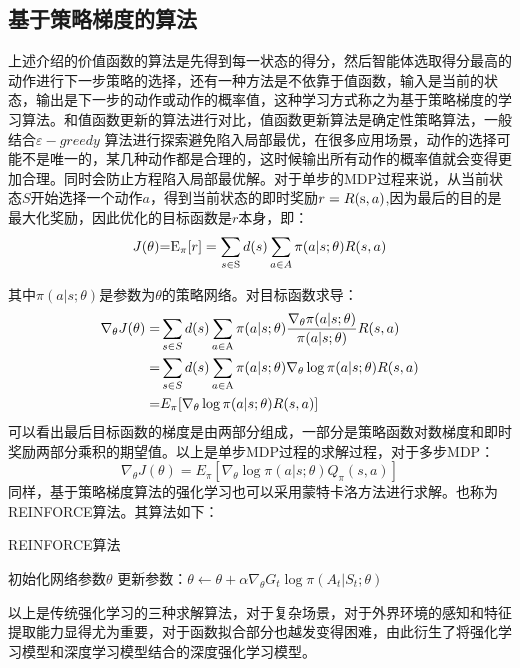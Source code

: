 \subsection{基于策略梯度的算法}
上述介绍的价值函数的算法是先得到每一状态的得分，然后智能体选取得分最高的动作进行下一步策略的选择，还有一种方法是不依靠于值函数，输入是当前的状态，输出是下一步的动作或动作的概率值，这种学习方式称之为基于策略梯度的学习算法。和值函数更新的算法进行对比，值函数更新算法是确定性策略算法，一般结合$\varepsilon - greedy$ 算法进行探索避免陷入局部最优，在很多应用场景，动作的选择可能不是唯一的，某几种动作都是合理的，这时候输出所有动作的概率值就会变得更加合理。同时会防止方程陷入局部最优解。对于单步的MDP过程来说，从当前状态$S$开始选择一个动作$a$，得到当前状态的即时奖励$ r = R({\rm{s}},a) $,因为最后的目的是最大化奖励，因此优化的目标函数是$r$本身，即：
\begin{equation}
J(\theta ){\rm{ = }}{{\rm{E}}_\pi }[r] = \sum\limits_{s \in {\rm{S}}} {d(s)\sum\limits_{a \in A} {\pi (a|s;\theta )} } R(s,a)
\end{equation}

其中${\pi (a|s;\theta )}$是参数为$\theta$的策略网络。对目标函数求导：
\begin{equation}
\begin{split}
{\nabla _\theta }J(\theta ) =& \sum\limits_{s \in S} {d(s)\sum\limits_{a \in {\rm{A}}} {\pi (a|s;\theta )} } \frac{{{\nabla _\theta }\pi (a|s;\theta )}}{{\pi (a|s;\theta )}}R(s,a) \\
=& \sum\limits_{s \in S} {d(s)\sum\limits_{a \in {\rm{A}}} {\pi (a|s;\theta )} } {\nabla _\theta }\log \pi (a|s;\theta )R(s,a) \\
=& {E_\pi }[{\nabla _\theta }\log \pi (a|s;\theta )R(s,a)]
\end{split}
\end{equation}
可以看出最后目标函数的梯度是由两部分组成，一部分是策略函数对数梯度和即时奖励两部分乘积的期望值。以上是单步MDP过程的求解过程，对于多步MDP：
\begin{equation}
{\nabla _\theta }J(\theta ) = {E_\pi }[{\nabla _\theta }\log \pi (a|s;\theta ){Q_\pi }(s,a)]
\end{equation}
同样，基于策略梯度算法的强化学习也可以采用蒙特卡洛方法进行求解。也称为REINFORCE算法\cite{williams1992simple}。其算法如下：
\begin{algorithm}
	\caption{REINFORCE算法}
	\label{algo:REINFORCE}
	\begin{algorithmic}[1] %
		\State 初始化网络参数$ \theta$ 
		\State 更新参数：$ \theta  \leftarrow \theta  + \alpha {\nabla _\theta }{G_t}\log \pi ({A_t}|{S_t};\theta )$
		\EndFor
		\EndFor
	\end{algorithmic}
\end{algorithm}
以上是传统强化学习的三种求解算法，对于复杂场景，对于外界环境的感知和特征提取能力显得尤为重要，对于函数拟合部分也越发变得困难，由此衍生了将强化学习模型和深度学习模型结合的深度强化学习模型。
